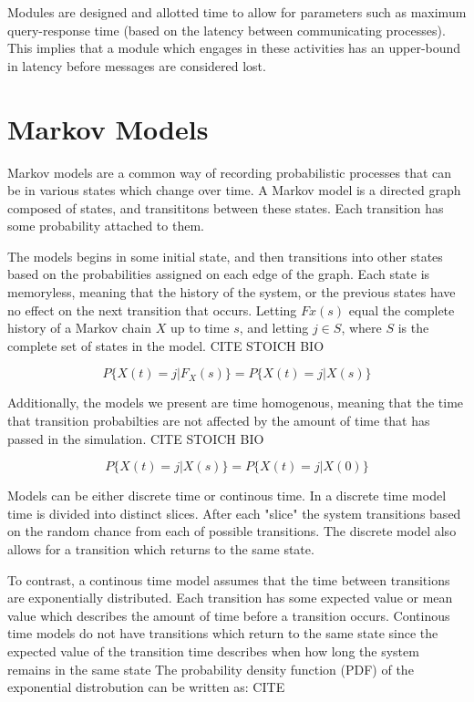 Modules are designed and allotted time to allow for parameters such as maximum
query-response time (based on the latency between communicating processes). 
This implies that a module which engages in these activities has an
upper-bound in latency before messages are considered lost.

\section{Markov Models}

Markov models are a common way of recording probabilistic processes that can
be in various states which change over time. A Markov model is a directed
graph composed of states, and transititons between these states. Each
transition has some probability attached to them.

The models begins in some initial state, and then transitions into other states
based on the probabilities assigned on each edge of the graph. Each state is
memoryless, meaning that the history of the system, or the previous states have
no effect on the next transition that occurs. Letting $Fx(s)$ equal the complete
history of a Markov chain $X$ up to time $s$, and letting $j \in S$, where $S$
is the complete set of states in the model. CITE STOICH BIO

\begin{equation}
P\{ X(t)=j | F_X(s) \} = P\{ X(t)=j | X(s) \}
\end{equation}

Additionally, the models we present are time homogenous, meaning that the
time that transition probabilties are not affected by the amount of time that
has passed in the simulation. CITE STOICH BIO

\begin{equation}
P\{ X(t)=j | X(s) \} = P\{ X(t)=j | X(0) \}
\end{equation}

Models can be either discrete time or continous time. In a discrete time model
time is divided into distinct slices. After each "slice" the system transitions
based on the random chance from each of possible transitions. The discrete model
also allows for a transition which returns to the same state.

To contrast, a continous time model assumes that the time between transitions
are exponentially distributed. Each transition has some expected value or mean
value which describes the amount of time before a transition occurs. Continous
time models do not have transitions which return to the same state since the
expected value of the transition time describes when how long the system 
remains in the same state The probability density
function (PDF) of the exponential distrobution can be written as: CITE

